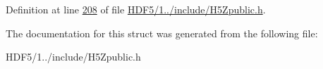 Definition at line \hyperlink{_h_d_f5_21_810_81_2include_2_h5_zpublic_8h_source_l00208}{208} of file \hyperlink{_h_d_f5_21_810_81_2include_2_h5_zpublic_8h_source}{H\+D\+F5/1../include/\+H5\+Zpublic.\+h}.



The documentation for this struct was generated from the following file\+:\begin{DoxyCompactItemize}
\item 
H\+D\+F5/1../include/\+H5\+Zpublic.\+h\end{DoxyCompactItemize}
